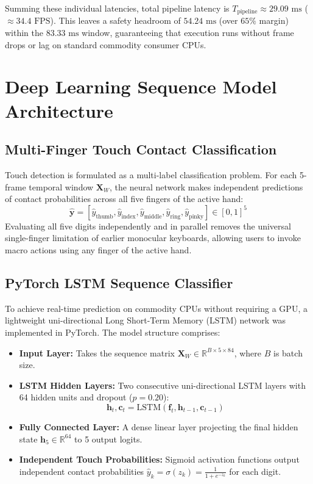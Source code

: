 Summing these individual latencies, total pipeline latency is $T_{\text{pipeline}} \approx 29.09\text{ ms}$ ($\approx 34.4\text{ FPS}$). This leaves a safety headroom of $54.24\text{ ms}$ (over $65\%$ margin) within the $83.33\text{ ms}$ window, guaranteeing that execution runs without frame drops or lag on standard commodity consumer CPUs.

\section{Deep Learning Sequence Model Architecture}
\label{sec:meth_dl_models}

\subsection{Multi-Finger Touch Contact Classification}
\label{subsec:meth_touch_formulation}
Touch detection is formulated as a multi-label classification problem. For each 5-frame temporal window $\mathbf{X}_W$, the neural network makes independent predictions of contact probabilities across all five fingers of the active hand:
\begin{equation}
\hat{\mathbf{y}} = \left[ \hat{y}_{\text{thumb}}, \hat{y}_{\text{index}}, \hat{y}_{\text{middle}}, \hat{y}_{\text{ring}}, \hat{y}_{\text{pinky}} \right] \in [0, 1]^5
\label{eq:meth_multilabel_prob}
\end{equation}
Evaluating all five digits independently and in parallel removes the universal single-finger limitation of earlier monocular keyboards, allowing users to invoke macro actions using any finger of the active hand.

\subsection{PyTorch LSTM Sequence Classifier}
\label{subsec:meth_lstm_arch}
To achieve real-time prediction on commodity CPUs without requiring a GPU, a lightweight uni-directional Long Short-Term Memory (LSTM) network was implemented in PyTorch. The model structure comprises:
\begin{itemize}
    \item \textbf{Input Layer:} Takes the sequence matrix $\mathbf{X}_W \in \mathbb{R}^{B \times 5 \times 84}$, where $B$ is batch size.
    \item \textbf{LSTM Hidden Layers:} Two consecutive uni-directional LSTM layers with 64 hidden units and dropout ($p = 0.20$):
    \begin{equation}
    \mathbf{h}_t, \mathbf{c}_t = \text{LSTM}(\mathbf{f}_t, \mathbf{h}_{t-1}, \mathbf{c}_{t-1})
    \label{eq:meth_lstm_step}
    \end{equation}
    \item \textbf{Fully Connected Layer:} A dense linear layer projecting the final hidden state $\mathbf{h}_5 \in \mathbb{R}^{64}$ to 5 output logits.
    \item \textbf{Independent Touch Probabilities:} Sigmoid activation functions output independent contact probabilities $\hat{y}_k = \sigma(z_k) = \frac{1}{1 + e^{-z_k}}$ for each digit.
\end{itemize}

